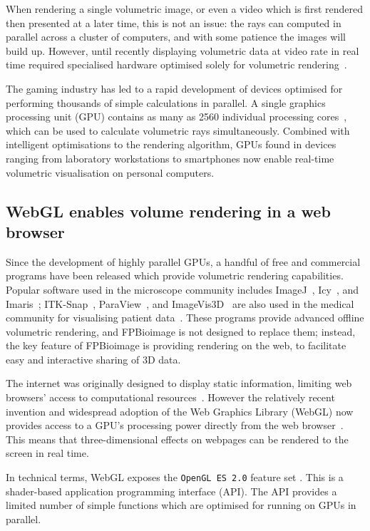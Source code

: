 When rendering a single volumetric image, or even a video which is first rendered then presented at a later time, this is not an issue: the rays can computed in parallel across a cluster of computers, and with some patience the images will build up.
However, until recently displaying volumetric data at video rate in real time required specialised hardware optimised solely for volumetric rendering~\cite{ray2000resample}.

The gaming industry has led to a rapid development of devices optimised for performing thousands of simple calculations in parallel.
A single graphics processing unit (GPU) contains as many as 2560 individual processing cores~\cite{nvidia1080}, which can be used to calculate volumetric rays simultaneously.
Combined with intelligent optimisations to the rendering algorithm, GPUs found in devices ranging from laboratory workstations to smartphones now enable real-time volumetric visualisation on personal computers.

\subsection{WebGL enables volume rendering in a web browser}
Since the development of highly parallel GPUs, a handful of free and commercial programs have been released which provide volumetric rendering capabilities.
Popular software used in the microscope community includes ImageJ~\cite{schindelin2012fiji}, Icy~\cite{de2012icy}, and Imaris~\cite{imaris}; ITK-Snap~\cite{yushkevich2006user}, ParaView~\cite{ayachit2015paraview}, and ImageVis3D~\cite{imagevis3d2015interactive} are also used in the medical community for visualising patient data~\cite{madan2015creating}.
These programs provide advanced offline volumetric rendering, and FPBioimage is not designed to replace them; instead, the key feature of FPBioimage is providing rendering on the web, to facilitate easy and interactive sharing of 3D data.

The internet was originally designed to display static information, limiting web browsers' access to computational resources~\cite{leiner2009brief}.
However the relatively recent invention and widespread adoption of the Web Graphics Library (WebGL) now provides access to a GPU's processing power directly from the web browser~\cite{khronos2009webgl}.
This means that three-dimensional effects on webpages can be rendered to the screen in real time.

In technical terms, WebGL exposes the \texttt{OpenGL ES 2.0} feature set \cite{khronos2009webgl}.
This is a shader-based application programming interface (API).
The API provides a limited number of simple functions which are optimised for running on GPUs in parallel.

